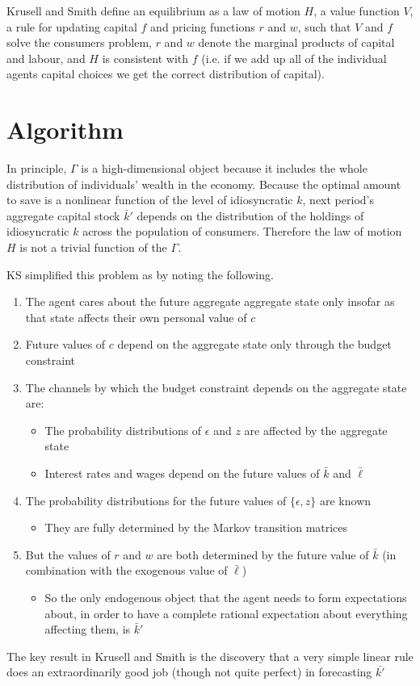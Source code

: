 \documentclass[titlepage]{\econtex}\providecommand{\texname}{KrusellSmithRep}%
\begin{document}
Krusell and Smith define an equilibrium as a law of motion $H$, a value function $V$, a rule for updating capital $f$ and pricing functions $r$ and $w$, such that $V$ and $f$ solve the consumers problem, $r$ and $w$ denote the marginal products of capital and labour, and $H$ is consistent with $f$ (i.e. if we add up all of the individual agents capital choices we get the correct distribution of capital).

\section{Algorithm}

In principle, $\Gamma$ is a high-dimensional object because it includes the whole distribution of individuals' wealth in the economy. Because the optimal amount to save is a nonlinear function of the level of idiosyncratic $k$, next period's aggregate capital stock $\bar{k}'$ depends on the distribution of the holdings of idiosyncratic $k$ across the population of consumers. Therefore the law of motion $H$ is not a trivial function of the $\Gamma$. 

KS simplified this problem as by noting the following. 

\begin{enumerate}
\item The agent cares about the future aggregate aggregate state only insofar as that state affects their own personal value of $c$
\item Future values of $c$ depend on the aggregate state only through the budget constraint
\item The channels by which the budget constraint depends on the aggregate state are:
\begin{itemize}
\item The probability distributions of $\epsilon$ and $z$ are affected by the aggregate state
\item Interest rates and wages depend on the future values of $\bar{k}$ and $\bar{\ell}$
\end{itemize}
\item The probability distributions for the future values of $\{\epsilon, z\}$ are known
\begin{itemize}
	\item They are fully determined by the Markov transition matrices
\end{itemize}
\item But the values of $r$ and $w$ are both determined by the future value of $\bar{k}$ (in combination with the exogenous value of $\bar{\ell}$)
\begin{itemize}
	\item  So the only endogenous object that the agent needs to form expectations about, in order to have a complete rational expectation about everything affecting them, is $\bar{k}'$
\end{itemize}
\end{enumerate}
The key result in Krusell and Smith is the discovery that a very simple linear rule does an extraordinarily good job (though not quite perfect) in forecasting $\bar{k'}$
\end{document}

